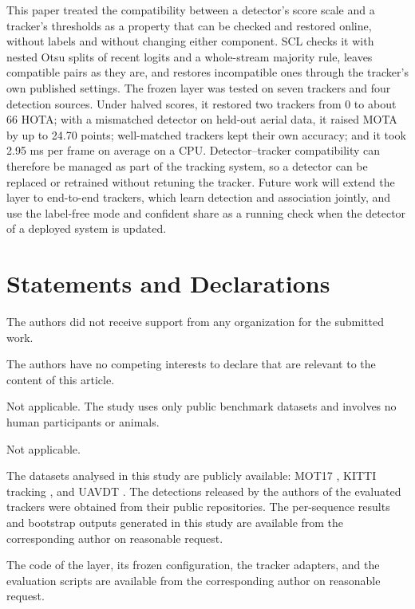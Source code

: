 \documentclass[pdflatex,sn-mathphys-num,iicol]{sn-jnl}
\newcommand{\scl}{SCL}
\begin{document}
This paper treated the compatibility between a detector's score scale and a tracker's thresholds
as a property that can be checked and restored online, without labels and without changing either
component. \scl{} checks it with nested Otsu splits of recent logits and a whole-stream majority
rule, leaves compatible pairs as they are, and restores incompatible ones through the tracker's own
published settings. The frozen layer was tested on seven trackers and four
detection sources. Under halved scores, it restored two trackers from 0 to about 66 HOTA; with a
mismatched detector on held-out aerial data, it raised MOTA by up to 24.70 points; well-matched
trackers kept their own accuracy; and it took 2.95 ms per frame on average on a CPU.
Detector--tracker compatibility can therefore be managed as part of the tracking system, so a
detector can be replaced or retrained without retuning the tracker. Future work will extend the
layer to end-to-end trackers, which learn detection and association jointly, and use the label-free
mode and confident share as a running check when the detector of a deployed system is updated.

\FloatBarrier
\backmatter

\section*{Statements and Declarations}

The authors did not receive support from any organization for the submitted work.

The authors have no competing interests to declare that are relevant to the content of this
article.

Not applicable. The study uses only public benchmark datasets and involves no human participants
or animals.

Not applicable.

The datasets analysed in this study are publicly available: MOT17 \cite{milan2016mot16}, KITTI
tracking \cite{geiger2012kitti}, and UAVDT \cite{du2018uavdt}. The detections released by the
authors of the evaluated trackers were obtained from their public repositories. The per-sequence
results and bootstrap outputs generated in this study are available from the corresponding author
on reasonable request.

The code of the layer, its frozen configuration, the tracker adapters, and the evaluation scripts
are available from the corresponding author on reasonable request.
\ifdefined\anonymousversion\else
\end{document}
